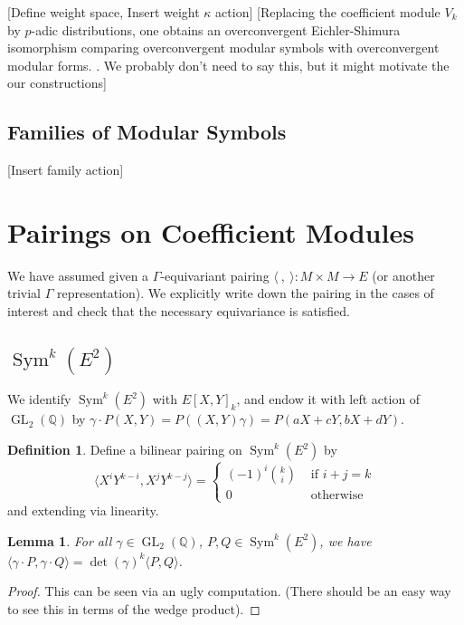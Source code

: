 \documentclass[10pt]{amsart}
\theoremstyle{plain}
\newtheorem{lemma}[theorem]{Lemma}
\theoremstyle{definition}
\newtheorem{definition}[theorem]{Definition}
\newcommand{\QQ}{{\mathbb{Q}}}
\DeclareMathOperator{\GL}{GL}
\DeclareMathOperator{\Sym}{Sym}
\begin{document}
[Define weight space, Insert weight $\kappa$ action]
[Replacing the coefficient module $V_k$ by $p$-adic distributions, one obtains an overconvergent Eichler-Shimura isomorphism comparing overconvergent modular symbols with overconvergent modular forms. \cite{Andreatta, Iovita, Stevens}. We probably don't need to say this, but it might motivate the our constructions]



\subsection{Families of Modular Symbols}
[Insert family action]

\section{Pairings on Coefficient Modules} \label{sec:coeff_pairing}

We have assumed given a $\Gamma$-equivariant pairing $\langle~,~ \rangle : M \times M \longrightarrow E$ (or another trivial $\Gamma$ representation). We explicitly write down the pairing in the cases of interest and check that the necessary equivariance is satisfied. 

\subsection{$\Sym^k(E^2)$}

We identify $\Sym^k(E^2)$ with $E[X,Y]_k$, and endow it with left action of $\GL_2(\QQ)$ by $\gamma \cdot P(X,Y) = P((X,Y)\gamma)=P(aX+cY,bX+dY).$ 
\begin{definition}
Define a bilinear pairing on $\Sym^k(E^2)$ by
\begin{equation*}
	\langle X^iY^{k-i}, X^j Y^{k-j} \rangle = \begin{cases} (-1)^i {k \choose i} & \text{ if } i+j=k\\
												0	& \text{ otherwise} \end{cases}
\end{equation*}
and extending via linearity.
\end{definition}


\begin{lemma}
For all $\gamma\in \GL_2(\QQ)$, $P,Q\in\Sym^k(E^2)$, we have $\langle \gamma\cdot P,\gamma \cdot Q\rangle = \det(\gamma)^k \langle P,Q\rangle$.
\end{lemma}
\begin{proof}
This can be seen via an ugly computation. (There should be an easy way to see this in terms of the wedge product).
\end{proof}
\end{document}
